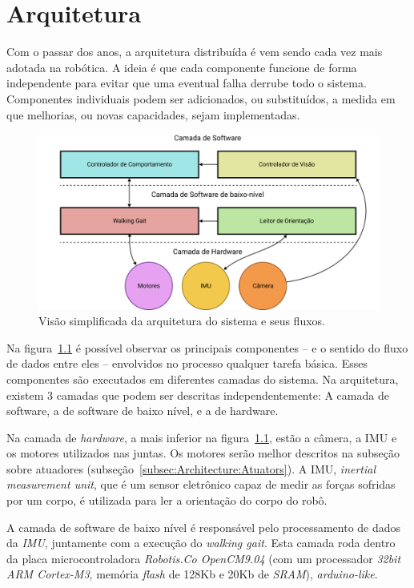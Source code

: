 \chapter{Arquitetura}
\label{ch:architecture}

Com o passar dos anos, a arquitetura distribuída é vem sendo cada vez mais adotada na robótica. A ideia é que cada componente funcione de forma independente para evitar que uma eventual falha derrube todo o sistema. Componentes individuais podem ser adicionados, ou substituídos, a medida em que melhorias, ou novas capacidades, sejam implementadas.

\begin{figure}[htb]
	\centering
	\includegraphics[scale=1]{imagens/svg/softwarearchitecture-flow}
	\caption{Visão simplificada da arquitetura do sistema e seus fluxos.}
	\label{fig:softwarearchitecture:overview}
\end{figure}

Na figura~\ref{fig:softwarearchitecture:overview} é possível observar os principais componentes -- e o sentido do fluxo de dados entre eles -- envolvidos no processo qualquer tarefa básica. Esses componentes são executados em diferentes camadas do sistema. Na arquitetura, existem 3 camadas que podem ser descritas independentemente: A camada de software, a de software de baixo nível, e a de hardware.

Na camada de \textit{hardware}, a mais inferior na figura~\ref{fig:softwarearchitecture:overview}, estão a câmera, a IMU e os motores utilizados nas juntas. Os motores serão melhor descritos na subseção sobre atuadores (subseção~\ref{subsec:Architecture:Atuators}). A IMU, \textit{inertial measurement unit}, que é um sensor eletrônico capaz de medir as forças sofridas por um corpo, é utilizada para ler a orientação do corpo do robô.

A camada de software de baixo nível é responsável pelo processamento de dados da \textit{IMU}, juntamente com a execução do \textit{walking gait}. Esta camada roda dentro da placa microcontroladora \textit{Robotis.Co OpenCM9.04} (com um processador \textit{32bit ARM Cortex-M3}, memória \textit{flash} de 128Kb e 20Kb de \textit{SRAM}), \textit{arduino-like}.

